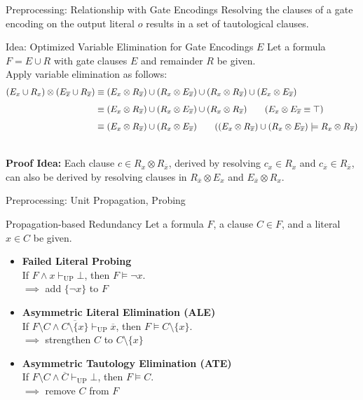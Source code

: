 \documentclass[t]{sdqbeamer}
\begin{document}
\begin{frame}{Preprocessing: Relationship with Gate Encodings}
Resolving the clauses of a gate encoding on the output literal $o$ results in a set of tautological clauses.\\[1em]
\begin{block}{Idea: Optimized Variable Elimination for Gate Encodings $E$}
Let a formula $F = E \cup R$ with gate clauses $E$ and remainder $R$ be given.\\
Apply variable elimination as follows:
\vspace*{-1ex}
\begin{align*}
( E_x \cup R_x) \otimes (E_{\overline x} \cup R_{\overline x}) 
&\equiv (E_x \otimes R_{\overline x}) \cup (R_x \otimes E_{\overline x}) \cup (R_x \otimes R_{\overline x}) \cup (E_x \otimes E_{\overline x})\\[1ex]
%
&\equiv (E_x \otimes R_{\overline x}) \cup (R_x \otimes E_{\overline x}) \cup (R_x \otimes R_{\overline x}) \tag{$E_x \otimes E_{\overline x} \equiv \top$}\\[1ex]
&\equiv (E_x \otimes R_{\overline x}) \cup (R_x \otimes E_{\overline x})
\tag{$(E_x \otimes R_{\overline x}) \cup (R_x \otimes E_{\overline x}) \models R_x \otimes R_{\overline x}$}
\end{align*}
\end{block}~\\[-1ex]
\textbf{Proof Idea:} Each clause $c \in R_x \otimes R_{\overline x}$, derived by resolving $c_x \in R_x$ and $c_{\overline x} \in R_{\overline x}$, can also be derived by resolving clauses in $R_{\overline x} \otimes E_x$ and $E_{\overline x} \otimes R_x$.
\end{frame}
    

\begin{frame}{Preprocessing: Unit Propagation, Probing}
\begin{block}{Propagation-based Redundancy}
Let a formula $F$, a clause $C \in F$, and a literal $x \in C$ be given.\\[1ex]
\begin{itemize}\setlength{\itemsep}{1ex}
    \item \textbf{Failed Literal Probing}\\[1pt]
    If $F \land x \vdash_{\mathop{UP}} \bot$, then $F \models \lnot x$.\\$\implies$ add $\{ \lnot x \}$ to $F$
    \item \textbf{Asymmetric Literal Elimination (ALE)}\\[1pt]
    If $F \setminus C \land \overline{C \setminus \{ x \}} \vdash_{\mathop{UP}} \overline x$, then $F \models C \setminus \{ x \}$.
    \\$\implies$ strengthen $C$ to $C \setminus \{ x \}$
    \item \textbf{Asymmetric Tautology Elimination (ATE)}\\[1pt]
    If $F \setminus C \land \overline C \vdash_{\mathop{UP}} \bot$, then $F \models C$.
    \\$\implies$ remove $C$ from $F$
\end{itemize}
\end{block}
\end{frame}
\end{document}
